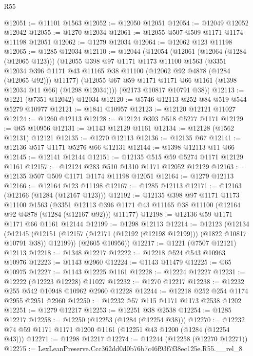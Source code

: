 \begin{lexlean}{R55}
\begin{coremodule}
@12051 := @11101 @1563
@12052 := @12050 @12051
@12054 := @12049 @12052 @12042
@12055 := @1270 @12034
@12061 := @12055 @507 @509 @1171 @1174 @11198 @12051
@12062 := @1279 @12034
@12064 := @12062 @123 @11198
@12065 := @1285 @12034
@12110 := @12044
    (@12054
      (@12061
        (@12064 (@1284 (@12065 @123)))
        (@12055
          @398
          @97
          @1171
          @1173
          @11100
          @1563
          (@3351
            @12034
            @396
            @1171
            @43
            @11165
            @38
            @11100
            (@12062 @92 @4878 (@1284 (@12065 @92)))
            @11177)
          (@12055 @67 @59 @1171 @1171 @66 @1161 (@1398 @12034 @11 @66) (@1298 @12034))))
      (@2173 @10817 @10791 @38))
@12113 := @1221 (@7351 @12042) @12034
@12120 := @5746 @12113 @252 @84 @519 @544 @5279 @10977
@12121 := @1841 @10957
@12123 := @12120 @12121 @11027
@12124 := @1260 @12113
@12128 := @12124 @303 @518 @5277 @1171
@12129 := @65 @10956
@12131 := @1143 @12129 @1161
@12134 := @12128 (@1562 @12131) @12121
@12135 := @1270 @12113
@12136 := @12135 @67
@12141 := @12136 @517 @1171 @5276 @66 @12131
@12144 := @1398 @12113 @11 @66
@12145 := @12141 @12144
@12151 := @12135 @515 @59 @5274 @1171 @12129 @1161
@12157 := @12124 @283 @510 @1310 @1171 @12052 @12129
@12163 := @12135 @507 @509 @1171 @1174 @11198 @12051
@12164 := @1279 @12113
@12166 := @12164 @123 @11198
@12167 := @1285 @12113
@12171 := @12163 (@12166 (@1284 (@12167 @123)))
@12192 := @12135
    @398
    @97
    @1171
    @1173
    @11100
    @1563
    (@3351 @12113 @396 @1171 @43 @11165 @38 @11100 (@12164 @92 @4878 (@1284 (@12167 @92))) @11177)
@12198 := @12136 @59 @1171 @1171 @66 @1161 @12144
@12199 := @1298 @12113
@12214 := @12123
    (@12134
      (@12145 (@12151 (@12157 (@12171 (@12192 (@12198 @12199))) (@1822 @10817 @10791 @38)) @12199))
      (@2605 @10956))
@12217 := @1221 (@7507 @12121) @12113
@12218 := @1348 @12217
@12222 := @12218 @524 @543 @10963 @10976
@12223 := @1143 @2960
@12224 := @1143 @11479
@12225 := @65 @10975
@12227 := @1143 @12225 @1161
@12228 := @12224 @12227
@12231 := @12222 (@12223 @12228) @11027
@12232 := @1270 @12217
@12238 := @12232 @255 @542 @10948 @10962 @2960 @12228
@12244 := @12218 @252 @254 @1174 @2955 @2951 @2960
@12250 := @12232 @57 @115 @1171 @1173 @2538 @1202
@12251 := @1279 @12217
@12253 := @12251 @38 @2538
@12254 := @1285 @12217
@12258 := @12250 (@12253 (@1284 (@12254 @38)))
@12270 := @12232 @74 @59 @1171 @1171 @1200 @1161 (@12251 @43 @1200 (@1284 (@12254 @43)))
@12271 := @1298 @12217
@12274 := @12244 (@12258 (@12270 @12271))
@12275 := LexLeanPreserve.Ccc362dd0d0b76b7c46f93f7f38ec125e.R55.__rel_8

\end{coremodule}
\end{lexlean}
